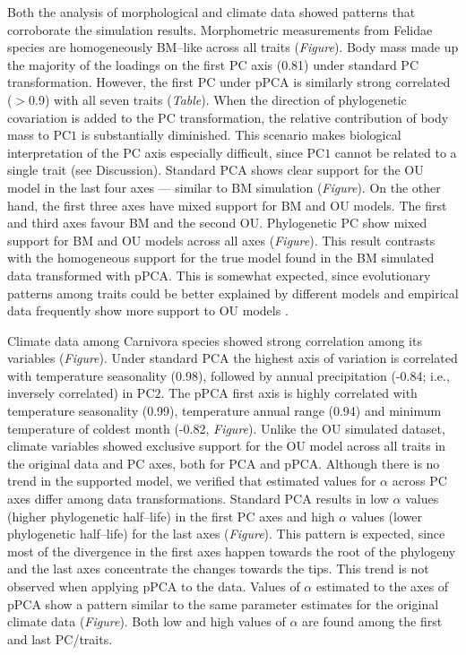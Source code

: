 \documentclass[a4paper,12pt]{article}
\begin{document}
Both the analysis of morphological and climate data showed patterns that corroborate the simulation results. Morphometric measurements from Felidae species are homogeneously BM--like across all traits (\textit{Figure}). Body mass made up the majority of the loadings on the first PC axis (0.81) under standard PC transformation. However, the first PC under pPCA is similarly strong correlated ($>$0.9) with all seven traits (\textit{Table}). When the direction of phylogenetic covariation is added to the PC transformation, the relative contribution of body mass to PC$1$ is substantially diminished. This scenario makes biological interpretation of the PC axis especially difficult, since PC$1$ cannot be related to a single trait (see Discussion). Standard PCA shows clear support for the OU model in the last four axes --- similar to BM simulation (\textit{Figure}). On the other hand, the first three axes have mixed support for BM and OU models. The first and third axes favour BM and the second OU. Phylogenetic PC show mixed support for BM and OU models across all axes (\textit{Figure}). This result contrasts with the homogeneous support for the true model found in the BM simulated data transformed with pPCA. This is somewhat expected, since evolutionary patterns among traits could be better explained by different models and empirical data frequently show more support to OU models \citep{Harmon2010}.

Climate data among Carnivora species showed strong correlation among its variables (\textit{Figure}). Under standard PCA the highest axis of variation is correlated with temperature seasonality (0.98), followed by annual precipitation (-0.84; i.e., inversely correlated) in PC$2$. The pPCA first axis is highly correlated with temperature seasonality (0.99), temperature annual range (0.94) and minimum temperature of coldest month (-0.82, \textit{Figure}). Unlike the OU simulated dataset, climate variables showed exclusive support for the OU model across all traits in the original data and PC axes, both for PCA and pPCA. Although there is no trend in the supported model, we verified that estimated values for $\alpha$ across PC axes differ among data transformations. Standard PCA results in low $\alpha$ values (higher phylogenetic half--life) in the first PC axes and high $\alpha$ values (lower phylogenetic half--life) for the last axes (\textit{Figure}). This pattern is expected, since most of the divergence in the first axes happen towards the root of the phylogeny and the last axes concentrate the changes towards the tips. This trend is not observed when applying pPCA to the data. Values of $\alpha$ estimated to the axes of pPCA show a pattern similar to the same parameter estimates for the original climate data (\textit{Figure}). Both low and high values of $\alpha$ are found among the first and last PC/traits.
\end{document}
